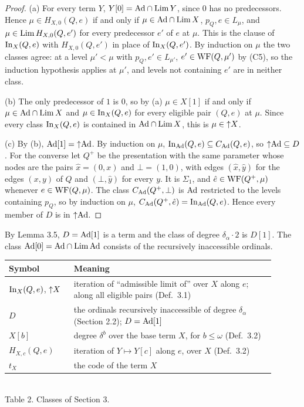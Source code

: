 \documentclass[11pt]{article}
\begin{document}
\begin{proof}
(a) For every term $Y$, $Y[0] = \mathrm{Ad} \cap \mathrm{Lim}\, Y$, since $0$ has no predecessors. Hence $\mu \in H_{X,0}(Q,e)$ if and only
if $\mu \in \mathrm{Ad} \cap \mathrm{Lim}\, X$, $p_Q, e \in L_\mu$, and $\mu \in \mathrm{Lim}\, H_{X,0}(Q,e')$ for every predecessor $e'$ of $e$ at
$\mu$. This is the clause of $\mathrm{In}_X(Q,e)$ with $H_{X,0}(Q,e')$ in place of $\mathrm{In}_X(Q,e')$. By induction on $\mu$ the two
classes agree: at a level $\mu' < \mu$ with $p_Q, e' \in L_{\mu'}$, $e' \in \mathrm{WF}(Q, \mu')$ by (C5), so the induction
hypothesis applies at $\mu'$, and levels not containing $e'$ are in neither class.

(b) The only predecessor of $1$ is $0$, so by (a) $\mu \in X[1]$ if and only if $\mu \in \mathrm{Ad} \cap \mathrm{Lim}\, X$ and $\mu \in
\mathrm{In}_X(Q,e)$ for every eligible pair $(Q,e)$ at $\mu$. Since every class $\mathrm{In}_X(Q,e)$ is contained in $\mathrm{Ad} \cap \mathrm{Lim}\, X$,
this is $\mu \in {\uparrow} X$.

(c) By (b), $\mathrm{Ad}[1] = {\uparrow} \mathrm{Ad}$. By induction on $\mu$, $\mathrm{In}_{\mathrm{Ad}}(Q,e) \subseteq C_{\mathrm{Ad}}(Q,e)$, so ${\uparrow} \mathrm{Ad} \subseteq D$. For
the converse let $Q^+$ be the presentation with the same parameter whose nodes are the pairs $\hat x = (0, x)$ and
$\bot = (1, 0)$, with edges $(\hat x, \hat y)$ for the edges $(x, y)$ of $Q$ and $(\bot, \hat y)$ for every $y$. It is
$\Sigma_1$, and $\hat e \in \mathrm{WF}(Q^+, \mu)$ whenever $e \in \mathrm{WF}(Q,\mu)$. The class $C_{\mathrm{Ad}}(Q^+, \bot)$ is $\mathrm{Ad}$ restricted to
the levels containing $p_Q$, so by induction on $\mu$, $C_{\mathrm{Ad}}(Q^+, \hat e) = \mathrm{In}_{\mathrm{Ad}}(Q, e)$. Hence every member of $D$ is
in ${\uparrow} \mathrm{Ad}$.
\end{proof}

By Lemma 3.5, $D = \mathrm{Ad}[1]$ is a term and the class of degree $\delta_\alpha \cdot 2$ is $D[1]$. The class $\mathrm{Ad}[0] = \mathrm{Ad}
\cap \mathrm{Lim}\, \mathrm{Ad}$ consists of the recursively inaccessible ordinals.

\begin{center}\begin{tabular}{p{0.22\linewidth}p{0.68\linewidth}}
\toprule
Symbol & Meaning \\
\midrule
$\mathrm{In}_X(Q,e)$, ${\uparrow} X$ & iteration of ``admissible limit of'' over $X$ along $e$; along all eligible pairs (Def.\ 3.1) \\
$D$ & the ordinals recursively inaccessible of degree $\delta_\alpha$ (Section 2.2); $D = \mathrm{Ad}[1]$ \\
$X[b]$ & degree $\delta^b$ over the base term $X$, for $b \le \omega$ (Def.\ 3.2) \\
$H_{X,c}(Q,e)$ & iteration of $Y \mapsto Y[c]$ along $e$, over $X$ (Def.\ 3.2) \\
$t_X$ & the code of the term $X$ \\
\bottomrule
\end{tabular}\\[0.4em]Table 2. Classes of Section 3.\end{center}
\end{document}
